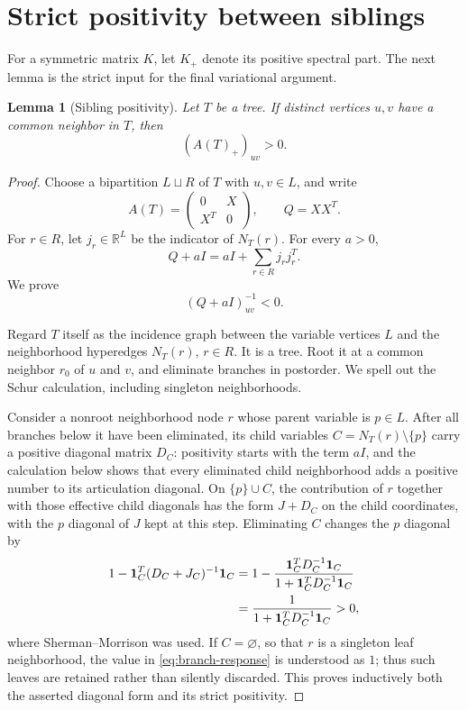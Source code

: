\documentclass[11pt]{article}
\newtheorem{lemma}[theorem]{Lemma}
\theoremstyle{remark}
\newcommand{\R}{\mathbb R}
\newcommand{\one}{\mathbf 1}
\begin{document}
\section{Strict positivity between siblings}\label{sec:siblings}

For a symmetric matrix $K$, let $K_+$ denote its positive spectral part.
The next lemma is the strict input for the final variational argument.

\begin{lemma}[Sibling positivity]\label{lem:siblings}
Let $T$ be a tree.  If distinct vertices $u,v$ have a common neighbor in
$T$, then
\[
 (A(T)_+)_{uv}>0.
\]
\end{lemma}

\begin{proof}
Choose a bipartition $L\sqcup R$ of $T$ with $u,v\in L$, and write
\begin{equation}\label{eq:bip-block}
 A(T)=\begin{pmatrix}0&X\\X^T&0\end{pmatrix},
 \qquad Q=XX^T.
\end{equation}
For $r\in R$, let $j_r\in\R^L$ be the indicator of $N_T(r)$.  For every
$a>0$,
\begin{equation}\label{eq:Q-hypergraph}
 Q+aI=aI+\sum_{r\in R}j_rj_r^T.
\end{equation}
We prove
\begin{equation}\label{eq:inverse-negative}
 (Q+aI)^{-1}_{uv}<0.
\end{equation}

Regard $T$ itself as the incidence graph between the variable vertices $L$
and the neighborhood hyperedges $N_T(r)$, $r\in R$.  It is a tree.  Root it
at a common neighbor $r_0$ of $u$ and $v$, and eliminate branches in
postorder.  We spell out the Schur calculation, including singleton
neighborhoods.

Consider a nonroot neighborhood node $r$ whose parent variable is $p\in L$.
After all branches below it have been eliminated, its child variables
$C=N_T(r)\setminus\{p\}$ carry a positive diagonal matrix
$D_C$: positivity starts with the term $aI$, and the calculation below shows
that every eliminated child neighborhood adds a positive number to its
articulation diagonal.  On $\{p\}\cup C$, the contribution of $r$ together
with those effective child diagonals has the form $J+D_C$ on the child
coordinates, with the $p$ diagonal of $J$ kept at this step.  Eliminating
$C$ changes the $p$ diagonal by
\begin{align}
 1-\one_C^T(D_C+J_C)^{-1}\one_C
 &=1-\frac{\one_C^TD_C^{-1}\one_C}
 {1+\one_C^TD_C^{-1}\one_C} \notag\\
 &=\frac{1}{1+\one_C^TD_C^{-1}\one_C}>0,
 \label{eq:branch-response}
\end{align}
where Sherman--Morrison was used.  If $C=\varnothing$, so that $r$ is a
singleton leaf neighborhood, the value in \eqref{eq:branch-response} is
understood as $1$; thus such leaves are retained rather than silently
discarded.  This proves inductively both the asserted diagonal form and its
strict positivity.


\end{proof}
\end{document}
